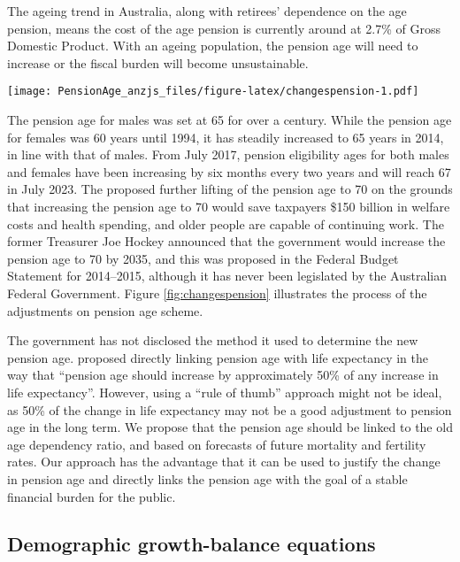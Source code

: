 \documentclass[
  doublespace]{anzsauth}
\let\origfigure\figure
\let\endorigfigure\endfigure
\renewenvironment{figure}[1][2] {
    \expandafter\origfigure\expandafter[tbp]
} {
    \endorigfigure
}
\begin{document}
The ageing trend in Australia, along with retirees' dependence on the age pension, means the cost of the age pension is currently around at 2.7\% of Gross Domestic Product. With an ageing population, the pension age will need to increase or the fiscal burden will become unsustainable.

\begin{figure}
\centering
\texttt{[image: PensionAge\_anzjs\_files/figure-latex/changespension-1.pdf]}
\caption{\label{fig:changespension}Australian pension age policies.}
\end{figure}

The pension age for males was set at 65 for over a century. While the pension age for females was 60 years until 1994, it has steadily increased to 65 years in 2014, in line with that of males. From July 2017, pension eligibility ages for both males and females have been increasing by six months every two years and will reach 67 in July 2023. The \citet{PC13} proposed further lifting of the pension age to 70 on the grounds that increasing the pension age to 70 would save taxpayers \$150 billion in welfare costs and health spending, and older people are capable of continuing work. The former Treasurer Joe Hockey announced that the government would increase the pension age to 70 by 2035, and this was proposed in the Federal Budget Statement for 2014--2015, although it has never been legislated by the Australian Federal Government. Figure \ref{fig:changespension} illustrates the process of the adjustments on pension age scheme.

The government has not disclosed the method it used to determine the new pension age. \citet[p7]{CEDA07} proposed directly linking pension age with life expectancy in the way that ``pension age should increase by approximately 50\% of any increase in life expectancy''. However, using a ``rule of thumb'' approach might not be ideal, as 50\% of the change in life expectancy may not be a good adjustment to pension age in the long term. We propose that the pension age should be linked to the old age dependency ratio, and based on forecasts of future mortality and fertility rates. Our approach has the advantage that it can be used to justify the change in pension age and directly links the pension age with the goal of a stable financial burden for the public.

\hypertarget{demographic-growth-balance-equations}{%
\subsection{Demographic growth-balance equations}\label{demographic-growth-balance-equations}}
\end{document}
